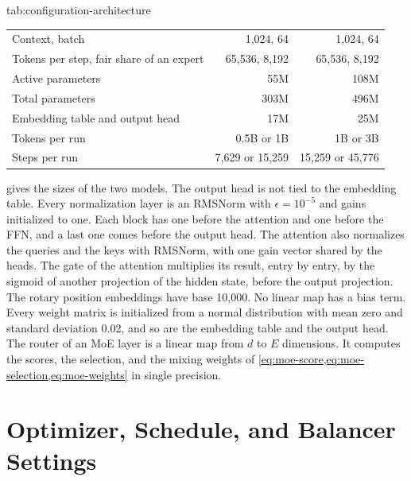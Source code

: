 \begin{table}[The architecture of the two model sizes]{tab:configuration-architecture}
\begin{tabular}{lrr}
    Context, batch                                               & 1,024, 64        & 1,024, 64        \\
    Tokens per step, fair share of an expert                     & 65,536, 8,192    & 65,536, 8,192    \\
    Active parameters                                            & 55M              & 108M             \\
    Total parameters                                             & 303M             & 496M             \\
    Embedding table and output head                              & 17M              & 25M              \\
    Tokens per run                                               & 0.5B or 1B       & 1B or 3B         \\
    Steps per run                                                & 7,629 or 15,259  & 15,259 or 45,776 \\
    \bottomrule
  \end{tabular}
\end{table}

 gives the sizes of the two models. The output head is not tied to the embedding table. Every normalization layer is an RMSNorm with $\epsilon = 10^{-5}$ and gains initialized to one. Each block has one before the attention and one before the FFN, and a last one comes before the output head. The attention also normalizes the queries and the keys with RMSNorm, with one gain vector shared by the heads. The gate of the attention multiplies its result, entry by entry, by the sigmoid of another projection of the hidden state, before the output projection. The rotary position embeddings have base 10,000. No linear map has a bias term. Every weight matrix is initialized from a normal distribution with mean zero and standard deviation 0.02, and so are the embedding table and the output head. The router of an MoE layer is a linear map from $d$ to $E$ dimensions. It computes the scores, the selection, and the mixing weights of \cref{eq:moe-score,eq:moe-selection,eq:moe-weights} in single precision.

\section{Optimizer, Schedule, and Balancer Settings}
\label{app:configuration-optimizer}

